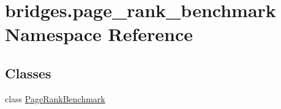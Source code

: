 \hypertarget{namespacebridges_1_1page__rank__benchmark}{}\section{bridges.\+page\+\_\+rank\+\_\+benchmark Namespace Reference}
\label{namespacebridges_1_1page__rank__benchmark}
\subsection*{Classes}
\begin{DoxyCompactItemize}
\item 
class \hyperlink{classbridges_1_1page__rank__benchmark_1_1_page_rank_benchmark}{Page\+Rank\+Benchmark}
\end{DoxyCompactItemize}
